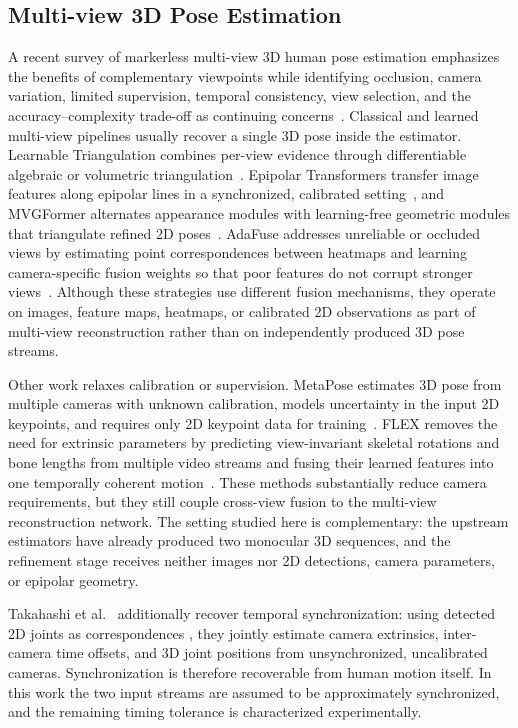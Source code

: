 \documentclass[preprint,12pt]{elsarticle}
\providecommand{\DIFaddbegin}{} %
\providecommand{\DIFaddend}{} %
\providecommand{\DIFadd}[1]{{\protect\color{blue}#1}} %
\begin{document}
\subsection{Multi-view 3D Pose Estimation}
A recent survey of markerless multi-view 3D human pose estimation emphasizes the benefits of complementary viewpoints while identifying occlusion, camera variation, limited supervision, temporal consistency, view selection, and the accuracy--complexity trade-off as continuing concerns~\cite{nogueira2025survey}. Classical and learned multi-view pipelines usually recover a single 3D pose inside the estimator. Learnable Triangulation combines per-view evidence through differentiable algebraic or volumetric triangulation~\cite{iskakov2019learnable}. Epipolar Transformers transfer image features along epipolar lines in a synchronized, calibrated setting~\cite{he2020epipolar}, and MVGFormer alternates appearance modules with learning-free geometric modules that triangulate refined 2D poses~\cite{liao2024multiple}. AdaFuse addresses unreliable or occluded views by estimating point correspondences between heatmaps and learning camera-specific fusion weights so that poor features do not corrupt stronger views~\cite{zhang2021adafuse}. Although these strategies use different fusion mechanisms, they operate on images, feature maps, heatmaps, or calibrated 2D observations as part of multi-view reconstruction rather than on independently produced 3D pose streams.

Other work relaxes calibration or supervision. MetaPose estimates 3D pose from multiple cameras with unknown calibration, models uncertainty in the input 2D keypoints, and requires only 2D keypoint data for training~\cite{usman2022metapose}. FLEX removes the need for extrinsic parameters by predicting view-invariant skeletal rotations and bone lengths from multiple video streams and fusing their learned features into one temporally coherent motion~\cite{gordon2022flex}. These methods substantially reduce camera requirements, but they still couple cross-view fusion to the multi-view reconstruction network. The setting studied here is complementary: the upstream estimators have already produced two monocular 3D sequences, and the refinement stage receives neither images nor 2D detections, camera parameters, or epipolar geometry.

Takahashi et al.~\cite{takahashi2018human}  \DIFaddbegin \DIFadd{additionally recover temporal synchronization: using }\DIFaddend detected 2D  joints as correspondences \DIFaddbegin \DIFadd{, they jointly estimate }\DIFaddend camera extrinsics, inter-camera time offsets, and 3D joint positions  \DIFaddbegin \DIFadd{from }\DIFaddend unsynchronized, uncalibrated  \DIFaddbegin \DIFadd{cameras. Synchronization is therefore recoverable from human motion itself. In this work the two input streams are assumed to be approximately synchronized, and }\DIFaddend the remaining timing  \DIFaddbegin \DIFadd{tolerance is characterized experimentally}\DIFaddend .
\end{document}
